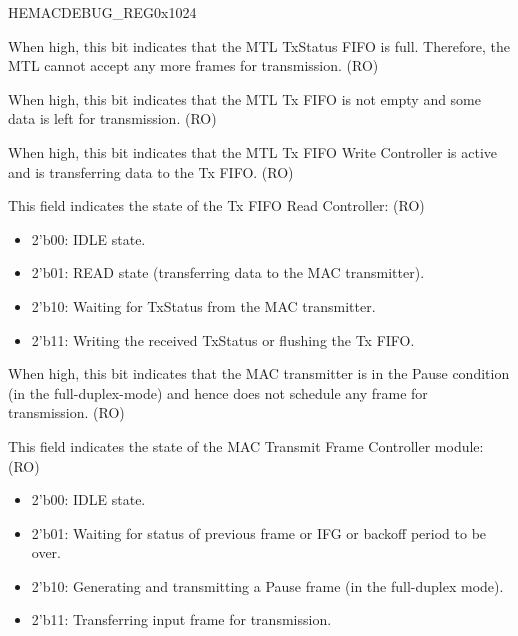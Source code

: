 \begin{register}{H}{EMACDEBUG\_REG}{0x1024}\label{regdesc:EMACDEBUGREG}
%
%
%
%
%
%
%
%
%
%
%
%
%
%
%
%
%
\regnewline%
\begin{regdesc}\begin{reglist}
\item [MTLTSFFS]When high, this bit indicates that the MTL TxStatus FIFO is full. Therefore, the MTL cannot accept any more frames for transmission.  (RO)
\item [MTLTFNES]When high, this bit indicates that the MTL Tx FIFO is not empty and some data is left for transmission. (RO)
\item [MTLTFWCS]When high, this bit indicates that the MTL Tx FIFO Write Controller is active and is transferring data to the Tx FIFO. (RO)
\item [MTLTFRCS]This field indicates the state of the Tx FIFO Read Controller: (RO) \begin{itemize}
\item 2'b00: IDLE state. \item 2'b01: READ state (transferring data to the MAC transmitter). \item 2'b10: Waiting for TxStatus from the MAC transmitter. \item 2'b11: Writing the received TxStatus or flushing the Tx FIFO.\end{itemize}
\item [MACTP]When high, this bit indicates that the MAC transmitter is in the Pause condition (in the full-duplex-mode) and hence does not schedule any frame for transmission. (RO)
\item [MACTFCS]This field indicates the state of the MAC Transmit Frame Controller module: (RO)
\begin{itemize}
\item 2'b00: IDLE state. \item 2'b01: Waiting for status of previous frame or IFG or backoff period to be over. \item 2'b10: Generating and transmitting a Pause frame (in the full-duplex mode). \item 2'b11: Transferring input frame for transmission.\end{itemize}

\end{reglist}
\end{regdesc}
\end{register}
